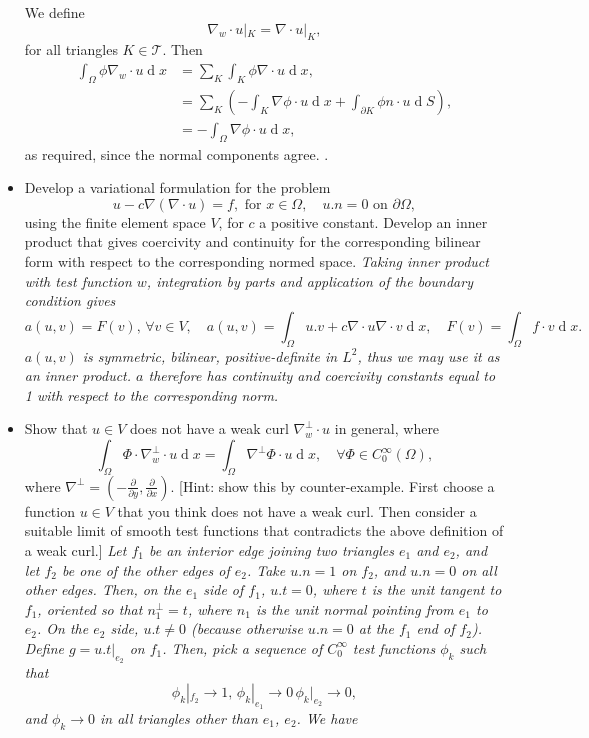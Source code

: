 \documentclass[12pt]{article}
\newenvironment{Question}[1] 
 {\begin{itemize} \item[\large #1.~~]}{\end{itemize} \medskip}
\newcommand{\Part}[1]{\item [(#1)~~]}
\DeclareMathOperator{\diff}{d}
\newcommand{\pp}[2]{\frac{\partial #1}{\partial #2}}
\newcommand{\soln}[1]{\newline \noindent {\bfseries Solution:} {\itshape \color{blue} #1}}
\newcommand{\soln}[1]{}
\begin{document}
\begin{Question}{2}
{We define
\[
\nabla_w\cdot u|_K = \nabla\cdot u|_K,
\]
for all triangles $K\in\mathcal{T}$. Then 
\begin{align*}
\int_\Omega \phi \nabla_w \cdot u \diff x & = \sum_K \int_K \phi \nabla\cdot u\diff x, \\
& = \sum_K \left(-\int_K \nabla\phi \cdot u\diff x + \int_{\partial K}
\phi n\cdot u \diff S\right), \\
& = -\int_\Omega \nabla\phi \cdot u \diff x,
\end{align*}
as required, since the normal components agree.
}
\Part{b} Develop a variational formulation for the problem
\[
u - c\nabla(\nabla\cdot u) = f, \mbox{ for }x\in \Omega,
\quad u.n=0 \mbox{ on }\partial\Omega,
\]
using the finite element space $V$, for $c$ a positive
constant. Develop an inner product that gives coercivity and continuity for the
corresponding bilinear form with respect to the corresponding normed space.
\soln{
Taking inner product with test function $w$, integration by parts and 
application of the boundary condition gives
\[
a(u,v) = F(v), \, \forall v\in V, \quad a(u,v) = \int_\Omega u.v 
+ c\nabla\cdot u\nabla\cdot v \diff x, \quad F(v)=\int_\Omega f\cdot v 
\diff x.
\]
$a(u,v)$ is symmetric, bilinear, positive-definite in $L^2$, thus we 
may use it as an inner product. $a$ therefore has continuity and coercivity
constants equal to 1 with respect to the corresponding norm.
}
\Part{c} Show that $u\in V$ does not have a weak curl $\nabla^\perp_w \cdot u$
in general, where
\[
\int_\Omega \Phi \cdot \nabla^\perp_w \cdot u \diff x = \int_\Omega \nabla^\perp
\Phi \cdot u \diff x, \quad \forall \Phi \in C_0^\infty(\Omega),
\]
where $\nabla^\perp=(-\pp{}{y},\pp{}{x})$. [Hint: show this by
  counter-example.  First choose a function $u\in V$ that you think
  does not have a weak curl. Then consider a suitable limit of smooth
  test functions that contradicts the above definition of a weak
  curl.]  \soln{ Let $f_1$ be an interior edge joining two triangles
  $e_1$ and $e_2$, and let $f_2$ be one of the other edges of
  $e_2$. Take $u.n=1$ on $f_2$, and $u.n=0$ on all other edges. Then,
  on the $e_1$ side of $f_1$, $u.t=0$, where $t$ is the unit tangent
  to $f_1$, oriented so that $n_1^\perp=t$, where $n_1$ is the unit
  normal pointing from $e_1$ to $e_2$. On the $e_2$ side, $u.t\neq 0$
  (because otherwise $u.n=0$ at the $f_1$ end of $f_2$).  Define
  $g=u.t|_{e_2}$ on $f_1$.  Then, pick a sequence of $C^\infty_0$ test
  functions $\phi_k$ such that
\[
\phi_k|_{f_2}  \to 1, \, \phi_k|_{e_1} \to 0\, \phi_k|_{e_2} \to 0,
\]
and $\phi_k \to 0$ in all triangles other than $e_1$, $e_2$. We have
}
\end{Question}
\end{document}
